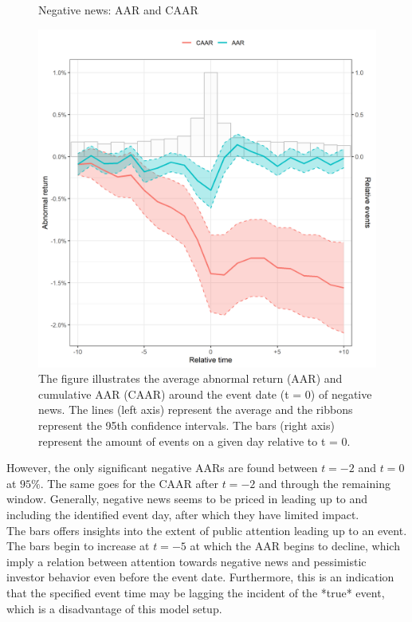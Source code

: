 \begin{figure} [H]
    \centering
    \caption{Negative news: AAR and CAAR}
    \includegraphics[scale=0.6]{Projekt/1.Figures analysis/ST_negative_all_CI.png}
     \caption*{\footnotesize The figure illustrates the average abnormal return (AAR) and cumulative AAR (CAAR) around the event date (t = 0) of negative news. The lines (left axis) represent the average and the ribbons represent the 95th confidence intervals. The bars (right axis) represent the amount of events on a given day relative to t = 0. }
    \label{fig:ST_neg_news}
\end{figure} 

However, the only significant negative AARs are found between $t=-2$ and $t=0$ at $95\%$. The same goes for the CAAR after $t=-2$ and through the remaining window. Generally, negative news seems to be priced in leading up to and including the identified event day, after which they have limited impact. \\ 
The bars offers insights into the extent of public attention leading up to an event. The bars begin to increase at $t=-5$ at which the AAR begins to decline, which imply a relation between attention towards negative news and pessimistic investor behavior even before the event date. Furthermore, this is an indication that the specified event time may be lagging the incident of the *true* event, which is a disadvantage of this model setup.  



